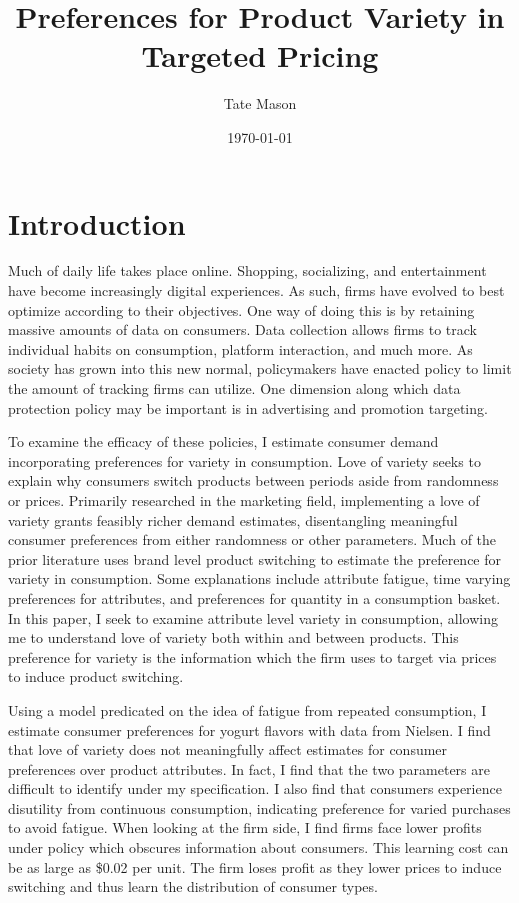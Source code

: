 \documentclass[11pt]{article}
\title{Preferences for Product Variety in Targeted Pricing}
\author{Tate Mason}
\date{\today}
\theoremstyle{definition}
\theoremstyle{remark}
\begin{document}
\maketitle
\thispagestyle{empty}
\newpage

\section{Introduction}

Much of daily life takes place online. Shopping, socializing, and entertainment have become increasingly digital experiences. As such, firms have evolved to best optimize according to their objectives. One way of doing this is by retaining massive amounts of data on consumers. Data collection allows firms to track individual habits on consumption, platform interaction, and much more. As society has grown into this new normal, policymakers have enacted policy to limit the amount of tracking firms can utilize. One dimension along which data protection policy may be important is in advertising and promotion targeting. 

To examine the efficacy of these policies, I estimate consumer demand incorporating preferences for variety in consumption. Love of variety seeks to explain why consumers switch products between periods aside from randomness or prices. Primarily researched in the marketing field, implementing a love of variety grants feasibly richer demand estimates, disentangling meaningful consumer preferences from either randomness or other parameters. Much of the prior literature uses brand level product switching to estimate the preference for variety in consumption. Some explanations include attribute fatigue, time varying preferences for attributes, and preferences for quantity in a consumption basket. In this paper, I seek to examine attribute level variety in consumption, allowing me to understand love of variety both within and between products. This preference for variety is the information which the firm uses to target via prices to induce product switching.

Using a model predicated on the idea of fatigue from repeated consumption, I estimate consumer preferences for yogurt flavors with data from Nielsen. I find that love of variety does not meaningfully affect estimates for consumer preferences over product attributes. In fact, I find that the two parameters are difficult to identify under my specification. I also find that consumers experience disutility from continuous consumption, indicating preference for varied purchases to avoid fatigue. When looking at the firm side, I find firms face lower profits under policy which obscures information about consumers. This learning cost can be as large as \$0.02 per unit. The firm loses profit as they lower prices to induce switching and thus learn the distribution of consumer types.
\end{document}
